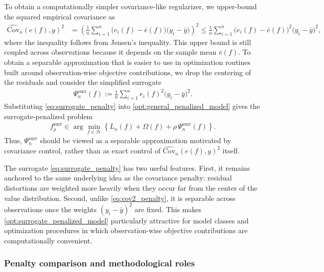 \documentclass[12pt, draft]{article}
\theoremstyle{plain}
\theoremstyle{definition}
\newcommand{\1}{\mathbf{1}}
\newcommand{\Cov}{\text{Cov}}
\renewcommand{\H}{\mathcal{H}}
\begin{document}
{To obtain a computationally simpler covariance-like regularizer, we upper-bound the squared empirical covariance as
\begin{align}
    \label{eq:covariance_upper_bound}
    \widehat{\Cov}_n(e(f),y)^2
    &=
    \left(
        \frac{1}{n}\sum_{i=1}^n
        \bigl(e_i(f)-\bar e(f)\bigr)\bigl(y_i-\bar y\bigr)
    \right)^2
    \le
    \frac{1}{n}\sum_{i=1}^n
    \bigl(e_i(f)-\bar e(f)\bigr)^2
    \bigl(y_i-\bar y\bigr)^2,
\end{align}
where the inequality follows from Jensen's inequality. This upper bound is still coupled across observations because it depends on the sample mean $\bar e(f)$. To obtain a separable approximation that is easier to use in optimization routines built around observation-wise objective contributions, we drop the centering of the residuals and consider the simplified surrogate
\begin{align}
    \label{eq:surrogate_penalty}
    \Psi_n^{\mathrm{surr}}(f)
    :=
    \frac{1}{n}\sum_{i=1}^n
    e_i(f)^2\bigl(y_i-\bar y\bigr)^2.
\end{align}
Substituting \eqref{eq:surrogate_penalty} into \eqref{opt:general_penalized_model} gives the surrogate-penalized problem
\begin{align}
    \label{opt:surrogate_penalized_model}
    f_{\rho}^{\mathrm{surr}}
    \in
    \arg\min_{f\in\H}
    \left\{
        L_n(f)+\Omega(f)
        +
        \rho\,\Psi_n^{\mathrm{surr}}(f)
    \right\}.
\end{align}
Thus, $\Psi_n^{\mathrm{surr}}$ should be viewed as a separable approximation motivated by covariance control, rather than as exact control of $\widehat{\Cov}_n(e(f),y)^2$ itself.

The surrogate \eqref{eq:surrogate_penalty} has two useful features. First, it remains anchored to the same underlying idea as the covariance penalty: residual distortions are weighted more heavily when they occur far from the center of the value distribution. Second, unlike \eqref{eq:cov2_penalty}, it is separable across observations once the weights $(y_i-\bar y)^2$ are fixed. This makes \eqref{opt:surrogate_penalized_model} particularly attractive for model classes and optimization procedures in which observation-wise objective contributions are computationally convenient.

\subsubsection{Penalty comparison and methodological roles}

}
\end{document}
